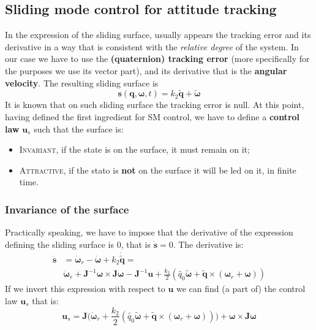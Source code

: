 \subsection{Sliding mode control for attitude tracking}
In the expression of the sliding surface, usually appears the tracking error and its derivative in a way that is consistent with the \textit{relative degree} of the system. In our case we have to use the \textbf{(quaternion) tracking error} (more specifically for the purposes we use its vector part), and its derivative that is the \textbf{angular velocity}. The resulting sliding surface is 
{\large{
    \begin{equation}
        \mathbf{s}(\mathbf{q}, \boldsymbol{\omega}, t) = k_2\tilde{\mathbf{q}}+\tilde{\boldsymbol{\omega}}
    \end{equation}
}}
It is known that on such sliding surface the tracking error is null. At this point, having defined the first ingredient for SM control, we have to define a \textbf{control law} $\mathbf{u}_s$ such that the surface is:
\begin{itemize}
    \item \textsc{Invariant}, if the state is on the surface, it must remain on it; 
    \item \textsc{Attractive}, if the stato is \textbf{not} on the surface it will be led on it, in finite time.
\end{itemize}

\subsubsection{Invariance of the surface}
Practically speaking, we have to impose that the derivative of the expression defining the sliding surface is 0, that is $\dot{\mathbf{s}}=0$. The derivative is:
\begin{align*}
    \dot{\mathbf{s}}&=\dot{\boldsymbol{\omega}}_r-\dot{\boldsymbol{\omega}}+k_2\dot{\tilde{\mathbf{q}}}=\\
    &\dot{\boldsymbol{\omega}}_r + \mathbf{J}^{-1}\boldsymbol{\omega} \times \mathbf{J}\boldsymbol{\omega} -
    \boldsymbol{J}^{-1}\mathbf{u} +
    \frac{k_2}{2} (\tilde{q_0}\tilde{\boldsymbol{\omega}}+\tilde{\mathbf{q}}\times (\boldsymbol{\omega}_r+\boldsymbol{\omega}) )
\end{align*}
If we invert this expression with respect to $\mathbf{u}$ we can find (a part of) the control law $\mathbf{u}_s$ that is:
\begin{equation}
    \mathbf{u}_s = \mathbf{J} \biggl(
        \dot{\boldsymbol{\omega}}_r +
        \frac{k_2}{2} (\tilde{q_0}\tilde{\boldsymbol{\omega}}+\tilde{\mathbf{q}}\times (\boldsymbol{\omega}_r+\boldsymbol{\omega}) ) \biggr)+
        \boldsymbol{\omega} \times \mathbf{J}\boldsymbol{\omega}
\end{equation}

